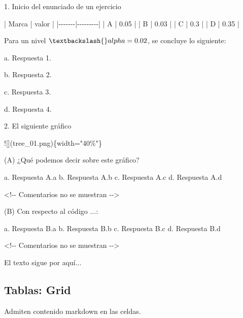 \documentclass[
  letterpaper,
  DIV=11,
  numbers=noendperiod]{scrartcl}
\newenvironment{Shaded}{\begin{snugshade}}{\end{snugshade}}
\newcommand{\AlertTok}[1]{\textcolor[rgb]{0.68,0.00,0.00}{#1}}
\newcommand{\InformationTok}[1]{\textcolor[rgb]{0.37,0.37,0.37}{#1}}
\newcommand{\NormalTok}[1]{\textcolor[rgb]{0.00,0.23,0.31}{#1}}
\newcommand{\SpecialStringTok}[1]{\textcolor[rgb]{0.13,0.47,0.30}{#1}}
\begin{document}
\begin{Shaded}
\begin{Highlighting}[]
\SpecialStringTok{1.  }\NormalTok{Inicio del enunciado de un ejercicio}

\NormalTok{    | Marca | valor   |}
\NormalTok{    |{-}{-}{-}{-}{-}{-}{-}|{-}{-}{-}{-}{-}{-}{-}{-}{-}|}
\NormalTok{    | A     | 0.05    |}
\NormalTok{    | B     | 0.03    |}
\NormalTok{    | C     | 0.3     |}
\NormalTok{    | D     | 0.35    |}

\NormalTok{    Para un nivel $\textbackslash{}alpha=0.02$, se concluye lo siguiente:}

\NormalTok{    a.  Respuesta 1.}

\NormalTok{    b.  Respuesta 2.}

\NormalTok{    c.  Respuesta 3.}

\NormalTok{    d.  Respuesta 4.}


\SpecialStringTok{2.  }\NormalTok{El siguiente gráfico  }

    \AlertTok{![](tree\_01.png)}\NormalTok{\{width="40\%"\}}

\NormalTok{    (A) ¿Qué podemos decir sobre este gráfico?}
    
\InformationTok{        a. Respuesta A.a}
\InformationTok{        b. Respuesta A.b}
\InformationTok{        c. Respuesta A.c}
\InformationTok{        d. Respuesta A.d}

\InformationTok{        \textless{}!{-}{-} Comentarios no se  muestran {-}{-}\textgreater{}}

\NormalTok{    (B) Con respecto al código ...:}

\InformationTok{        a. Respuesta B.a}
\InformationTok{        b. Respuesta B.b}
\InformationTok{        c. Respuesta B.c}
\InformationTok{        d. Respuesta B.d}

\InformationTok{        \textless{}!{-}{-} Comentarios no se  muestran {-}{-}\textgreater{}}
      
\NormalTok{El texto sigue por aquí...}
\end{Highlighting}
\end{Shaded}

\newpage{}

\subsection{Tablas: Grid}\label{tablas-grid}

Admiten contenido markdown en las celdas.
\end{document}

